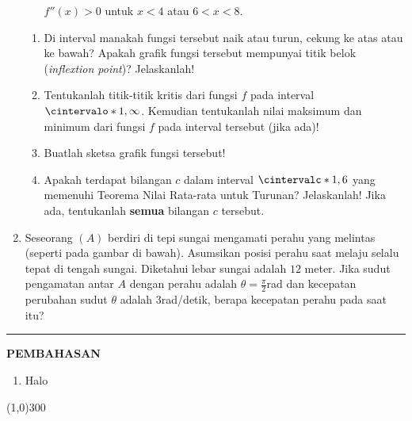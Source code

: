 \begin{enumerate}[leftmargin=*, label={\arabic*}.]
\begin{itemize}
    $f''(x)>0$ untuk $x<4$ atau $6 < x < 8$.
\end{itemize}
\begin{enumerate}[label={\alph*}.]
    \item Di interval manakah fungsi tersebut naik atau turun, cekung ke atas atau 
    ke bawah? Apakah grafik fungsi tersebut mempunyai titik belok 
    (\textit{inflextion point})? Jelaskanlah!
    \item Tentukanlah titik-titik kritis dari fungsi $f$ pada interval 
    $\cintervalo*{1,\infty}$. Kemudian tentukanlah nilai maksimum dan minimum dari fungsi $f$ 
    pada interval tersebut (jika ada)!
    \item Buatlah sketsa grafik fungsi tersebut!
    \item Apakah terdapat bilangan $c$ dalam interval $\cintervalc*{1,6}$ yang memenuhi 
    Teorema Nilai Rata-rata untuk Turunan? Jelaskanlah! Jika ada, tentukanlah \textbf{semua} 
    bilangan $c$ tersebut.
\end{enumerate}
\item Seseorang $(A)$ berdiri di tepi sungai mengamati perahu yang melintas (seperti pada 
gambar di bawah). Asumsikan posisi perahu saat melaju selalu tepat di tengah sungai. Diketahui 
lebar sungai adalah $12$ meter. Jika sudut pengamatan antar $A$ dengan perahu adalah 
$\theta =\frac{\pi}{2}$rad dan kecepatan perubahan sudut $\theta$ adalah $3$rad/detik, berapa 
kecepatan perahu pada saat itu?
\vspace{0.2cm}
\begin{center}
\end{center}
\end{enumerate}
\vspace{0.2cm}
\hrule height 1pt
\vspace{0.5cm}
\begin{center}
    \textbf{\large{PEMBAHASAN}}
\end{center}
\begin{enumerate}[leftmargin=*, label={\arabic*}.]
\item Halo

\end{enumerate}

\begin{center}
    \line(1,0){300}
\end{center}